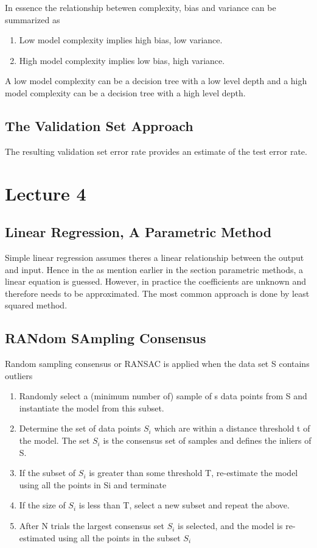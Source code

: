 \documentclass[12pt]{article}
\numberwithin{equation}{section}
\begin{document}
In essence the relationship betewen complexity, bias and variance can be summarized as
\begin{enumerate}
    \item Low model complexity implies high bias, low variance.
    \item High model complexity implies low bias, high variance.
\end{enumerate}
A low model complexity can be a decision tree with a low level depth and a high model complexity can be a decision tree with a high level depth.
\subsection{The Validation Set Approach}
The resulting validation set error rate provides an estimate of the test error rate.
\section{Lecture 4}
\subsection{Linear Regression, A Parametric Method}
Simple linear regression assumes theres a linear relationship between the output and input. Hence in the as mention earlier in the section parametric methods, a linear equation is guessed. However, in practice the coefficients are unknown and therefore needs to be approximated. The most common approach is done by least squared method.
\subsection{RANdom SAmpling Consensus}
Random sampling consensus or RANSAC is applied when the data set S contains outliers
\begin{enumerate}
    \item Randomly select a (minimum number of) sample of s data
    points from S and instantiate the model from this subset.
    \item Determine the set of data points $S_i$ which are within a distance threshold t of the model. The set $S_i$ is the consensus set of samples and defines the inliers of S.
    \item If the subset of $S_i$ is greater than some threshold T, re-estimate the model using all the points in Si and terminate
    \item If the size of $S_i$ is less than T, select a new subset and repeat the above.
    \item After N trials the largest consensus set $S_i$ is selected, and the model is re-estimated using all the points in the subset $S_i$
\end{enumerate}
\end{document}
